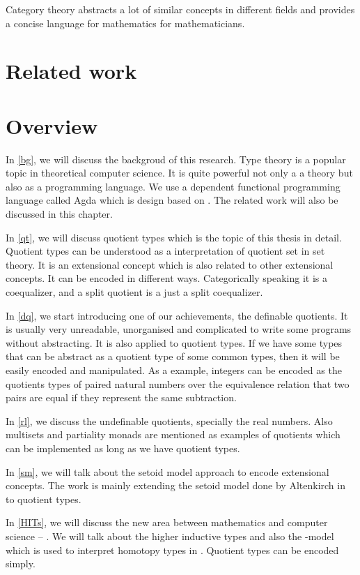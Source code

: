 Category theory abstracts a lot of similar concepts in different
fields and provides a concise language for mathematics for
mathematicians.

\section{Related work}


\section{Overview}





In \autoref{bg}, we will discuss the backgroud of this research. Type theory is a popular topic in
theoretical computer science. It is quite powerful not only a a theory
but also as a programming language. We use a dependent functional
programming language called Agda which is design based on \mltt. The
 related work will also be discussed in this chapter.


In \autoref{qt}, we will discuss quotient types which is the topic of
this thesis in detail. Quotient types
can be understood as a interpretation of quotient set in set
theory. It is an extensional concept which is also related to other extensional concepts. It can be encoded in different ways. Categorically speaking it
is a coequalizer, and a split quotient is a just a split coequalizer.


In \autoref{dq}, we start introducing one of our achievements, the
definable quotients. It is usually very unreadable, unorganised and
complicated to write some programs without abstracting. It is also
applied to quotient types. If we have some types that can be abstract
as a quotient type of some common types, then it will be easily
encoded and manipulated. As a example, integers can be encoded as the
quotients types of paired natural numbers over the equivalence
relation that two pairs are equal if they represent the same
subtraction.

In \autoref{rl}, we discuss the undefinable quotients, specially the
real numbers. Also multisets and partiality monads are mentioned as
examples of quotients which can be implemented as long as we have
quotient types. 


In \autoref{sm}, we will talk about the setoid model approach to encode
extensional concepts. The work is mainly extending the setoid model
done by Altenkirch in \cite{alti:lics99} to
quotient types.


In \autoref{HITs}, we will discuss the new area between mathematics and
computer science -- \hott. We will talk about the higher inductive
types and also the \wog-model which is used to interpret
homotopy types in \itt. Quotient types can be encoded \hott simply.